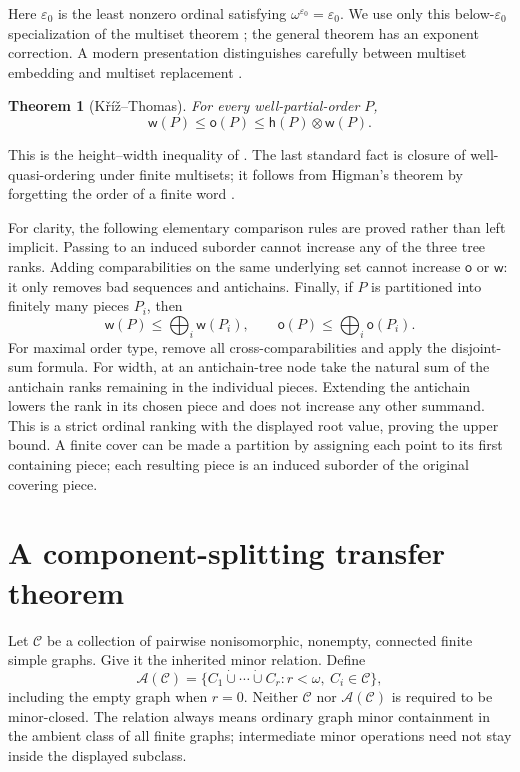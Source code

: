 \documentclass[11pt,letterpaper]{article}
\theoremstyle{plain}
\newtheorem{theorem}{Theorem}[section]
\theoremstyle{definition}
\theoremstyle{remark}
\newcommand{\mot}{\mathsf o}
\newcommand{\wid}{\mathsf w}
\newcommand{\hei}{\mathsf h}
\newcommand{\Cl}{\mathcal C}
\newcommand{\Add}{\mathcal A}
\newcommand{\bigop}{\mathop{\bigoplus}}
\newcommand{\sqgraph}{\mathbin{\dot\cup}}
\newcommand{\eps}{\varepsilon}
\begin{document}
Here $\eps_0$ is the least nonzero ordinal satisfying
$\omega^{\eps_0}=\eps_0$. We use only this below-$\eps_0$ specialization of the multiset theorem
\cite{Weiermann,VanDerMeeren}; the general theorem has an exponent
correction. A modern presentation distinguishes carefully between
multiset embedding and multiset replacement \cite{VialardMultisets}.

\begin{theorem}[K\v r\'i\v z--Thomas]\label{thm:KT}
For every well-partial-order $P$,
\[
 \wid(P)\le\mot(P)\le\hei(P)\otimes\wid(P).
\]
\end{theorem}

This is the height--width inequality of \cite{KrizThomas}. The last
standard fact is closure of well-quasi-ordering under finite multisets;
it follows from Higman's theorem by forgetting the order of a finite
word \cite{Higman}.

For clarity, the following elementary comparison rules are proved rather
than left implicit. Passing to an induced suborder cannot increase any
of the three tree ranks. Adding comparabilities on the same underlying
set cannot increase $\mot$ or $\wid$: it only removes bad sequences and
antichains. Finally, if $P$ is partitioned into finitely many pieces
$P_i$, then
\begin{equation}\label{eq:finitecover}
 \wid(P)\le\bigop_i\wid(P_i),
 \qquad
 \mot(P)\le\bigop_i\mot(P_i).
\end{equation}
For maximal order type, remove all cross-comparabilities and apply the
disjoint-sum formula. For width, at an antichain-tree node take the natural
sum of the antichain ranks remaining in the individual pieces. Extending
the antichain lowers the rank in its chosen piece and does not increase
any other summand. This is a strict ordinal ranking with the displayed
root value, proving the upper bound. A finite cover can be made a partition
by assigning each point to its first containing piece; each resulting
piece is an induced suborder of the original covering piece.

\section{A component-splitting transfer theorem}\label{sec:components}

Let $\Cl$ be a collection of pairwise nonisomorphic, nonempty, connected
finite simple graphs. Give it the inherited minor relation. Define
\[
 \Add(\Cl)=\{C_1\sqgraph\cdots\sqgraph C_r:
          r<\omega,\ C_i\in\Cl\},
\]
including the empty graph when $r=0$. Neither $\Cl$ nor $\Add(\Cl)$ is
required to be minor-closed. The relation always means ordinary graph
minor containment in the ambient class of all finite graphs; intermediate
minor operations need not stay inside the displayed subclass.
\end{document}
